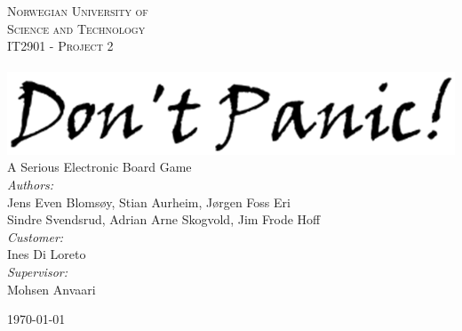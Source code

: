 \begin{center}



\textsc{\LARGE Norwegian University of\\ Science and Technology}\\[1.5cm]

\textsc{\Large IT2901 - Project 2}\\[0.5cm]

\HRule \\[0.4cm]
{%
	\includegraphics[width=1.0\textwidth]{img/dontpanic_logo}\\[0.4cm]}
	A Serious Electronic Board Game
\HRule \\[1.5cm]


	\emph{Authors:}\\
	Jens Even Blomsøy, Stian Aurheim, Jørgen Foss Eri \\
	Sindre Svendsrud, Adrian Arne Skogvold, Jim Frode Hoff\\
	\vspace{10 mm}
	\emph{Customer:} \\
	Ines Di Loreto\\
	\vspace{10 mm}
	\emph{Supervisor:} \\
	Mohsen Anvaari

\vfill

{\large \today}

\end{center}
\pagebreak
